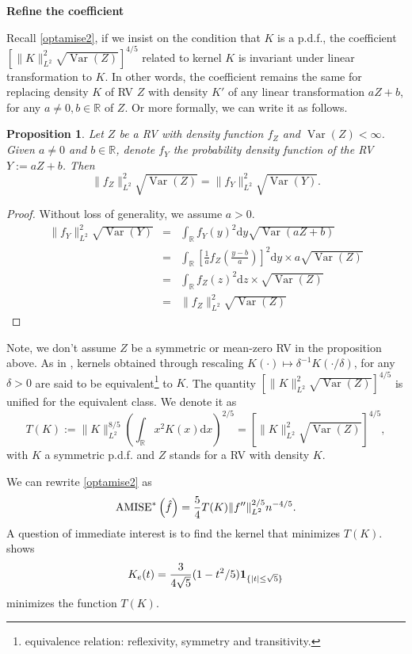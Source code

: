 \documentclass[19pt,landscape]{article}
\newtheorem{prop}[thm]{Proposition}
\newcommand{\bone}{{\bf 1}}
\newcommand{\R}{\mathbb{R}}
\DeclareMathOperator{\var}{\mathrm{Var}}
\begin{document}
\newpage
{\LARGE\centerline{\textbf{Refine the coefficient}}}
\vskip15pt
    \large 
    \noindent
    Recall \eqref{optamise2}, if we insist on the condition that $K$ is a p.d.f., the coefficient $\left[\|K\|^2_{L^2}\sqrt{\var(Z)}\right]^{4/5}$ related to kernel $K$ is invariant under linear transformation to $K$. In other words, the coefficient remains the same for replacing density $K$ of RV $Z$ with density $K'$ of any linear transformation $aZ+b$, for any $a\ne0, b\in\R$ of $Z$. Or more formally, we can write it as follows. 
\begin{prop} 
    Let $Z$ be a RV with density function $f_Z$ and $\var(Z)<\infty$. Given $a\ne0$ and $b\in \R$, denote $f_Y$ the probability density function of the RV $Y:= aZ+b$. Then 
    \begin{equation}
\|f_Z\|^2_{L^2}\sqrt{\var(Z)}=\|f_Y\|^2_{L^2}\sqrt{\var(Y)}.
    \end{equation}
\end{prop}
\begin{proof} Without loss of generality, we assume $a>0$.
    \begin{eqnarray*}
        \|f_Y\|^2_{L^2}\sqrt{\var(Y)}&=&\int_{\R}f_Y(y)^2\mathrm{d}y\sqrt{\var(aZ+b)}\\
        &=&\int_{\R}\left[\frac1af_Z\left(\frac{y-b}a\right)\right]^2\mathrm{d}y \times a\sqrt{\var(Z)}\\
        &=&\int_{\R}f_Z(z)^2\mathrm{d}z\times \sqrt{\var(Z)}\\
        &=&\|f_Z\|^2_{L^2}\sqrt{\var(Z)}
    \end{eqnarray*}
\end{proof}
Note, we don't assume $Z$ be a symmetric or mean-zero RV in the proposition above. 
\newpage
As in \cite{marron88}, kernels obtained through rescaling $K(\cdot)\mapsto \delta^{-1}K(\cdot/\delta)$, for any $\delta>0$ are said to be equivalent\footnote{equivalence relation: reflexivity, symmetry and transitivity.} to $K$. The quantity $\left[\|K\|^2_{L^2}\sqrt{\var(Z)}\right]^{4/5}$ is unified for the equivalent class. We denote it as 
\begin{equation}
    T(K):=\|K\|^{8/5}_{L^2}\left(\int_{\R}x^2K(x)\mathrm{d}x\right)^{2/5}=\left[\|K\|^2_{L^2}\sqrt{\var(Z)}\right]^{4/5},
\end{equation}
with $K$ a symmetric p.d.f. and $Z$ stands for a RV with density $K$.

We can rewrite \eqref{optamise2} as 
\begin{equation}\label{optamise3}
    {\rm AMISE}^*\left(\hat{f}\right)=\frac54T(K)\|f''\|_{L^2}^{2/5}n^{-4/5}.
\end{equation}
A question of immediate interest is to find the kernel that minimizes $T(K)$. 
\cite{epanechnikov} shows 
\begin{equation}
    K_e(t)=\frac3{4\sqrt{5}}(1-t^2/5)\bone_{\{|t|\le \sqrt{5}\}}
\end{equation}
minimizes the function $T(K)$.
\end{document}
